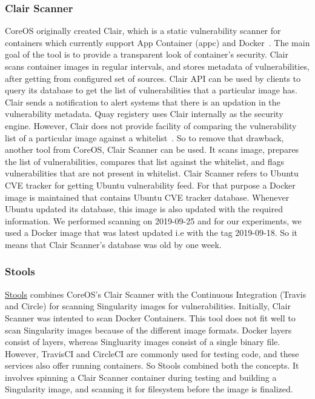 \documentclass[a4paper,num-refs]{oup-contemporary}
\begin{document}
\subsubsection{Clair Scanner}

CoreOS originally created Clair, which is a static vulnerability scanner for containers which
currently support App Container (appc) and Docker~\cite{coreos_2019}. The main goal of the
tool is to provide a transparent look of container’s security. Clair scans container images in regular
intervals, and stores metadata of vulnerabilities, after getting from configured
set of sources. Clair API can be used by clients to query its database to get
the list of vulnerabilities that a particular image has. Clair sends a notification
to alert systems that there is an updation in the vulnerability metadata. Quay
registery uses Clair internally as the security engine. However, Clair does not 
provide facility of comparing
the vulnerability list of a particular image against a whitelist~\cite{arminc_2019}. So to remove
that drawback, another tool from CoreOS, Clair Scanner can be used. It scans image, prepares the list of
vulnerabilities, compares that list against the whitelist, and flags vulnerabilities
that are not present in whitelist.
Clair Scanner refers to Ubuntu CVE tracker for getting Ubuntu vulnerability feed.
For that purpose a Docker image is maintained that contains Ubuntu CVE tracker database.
Whenever Ubuntu updated its database, this image is also updated with the required information.
We performed scanning on 2019-09-25 and for our experiments, we used a Docker image that was 
latest updated i.e with the tag 2019-09-18. So it means that Clair Scanner's database was
old by one week.

\subsubsection{Stools}

\href{https://github.com/singularityhub/stools}{Stools} combines CoreOS's Clair Scanner with the Continuous Integration (Travis and
Circle) for scanning Singularity images for vulnerabilities.
Initially, Clair Scanner was intented to scan Docker Containers. This tool does not fit well
to scan Singularity images because of the different image formats. Docker layers
consist of layers, whereas Singluarity images consist of a single binary file.
However, TravisCI and CircleCI are commonly used for testing code, and these
services also offer running containers. So Stools combined both the concepts.
It involves spinning a Clair Scanner container during testing and building a
Singularity image, and scanning it for filesystem before the image is finalized.
\end{document}
